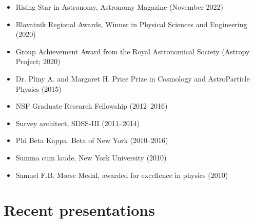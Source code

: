 \documentclass[12pt, letterpaper]{apw-cv}
\begin{document}
    \begin{itemize}
    \item Rising Star in Astronomy, Astronomy Magazine (November 2022)
    \item Blavatnik Regional Awards, Winner in Physical Sciences and Engineering (2020)
    \item Group Achievement Award from the Royal Astronomical Society (Astropy Project; 2020)
    \item Dr. Pliny A. and Margaret H. Price Prize in Cosmology and AstroParticle Physics (2015)
	\item NSF Graduate Research Fellowship (2012--2016)
	\item Survey architect, SDSS-III (2011--2014)
	\item Phi Beta Kappa, Beta of New York (2010--2016)
	\item Summa cum laude, New York University (2010)
	\item Samuel F.B. Morse Medal, awarded for excellence in physics (2010)
	\end{itemize}

\section*{Recent presentations}
\end{document}
